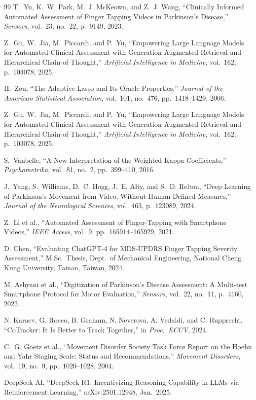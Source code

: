 \documentclass[12pt, a4paper]{article}
\begin{document}
\begin{thebibliography}{99}
T.~Yu, K.~W. Park, M.~J. McKeown, and Z.~J. Wang,
``Clinically Informed Automated Assessment of Finger Tapping Videos
in Parkinson's Disease,''
\textit{Sensors}, vol.~23, no.~22, p.~9149, 2023.

Z.~Gu, W.~Jia, M.~Piccardi, and P.~Yu,
``Empowering Large Language Models for Automated Clinical Assessment
with Generation-Augmented Retrieval and Hierarchical Chain-of-Thought,''
\textit{Artificial Intelligence in Medicine}, vol.~162, p.~103078, 2025.

H.~Zou,
``The Adaptive Lasso and Its Oracle Properties,''
\textit{Journal of the American Statistical Association},
vol.~101, no.~476, pp.~1418--1429, 2006.

Z.~Gu, W.~Jia, M.~Piccardi, and P.~Yu,
``Empowering Large Language Models for Automated Clinical Assessment
with Generation-Augmented Retrieval and Hierarchical Chain-of-Thought,''
\textit{Artificial Intelligence in Medicine}, vol.~162, p.~103078, 2025.

S.~Vanbelle,
``A New Interpretation of the Weighted Kappa Coefficients,''
\textit{Psychometrika}, vol.~81, no.~2, pp.~399--410, 2016.

J.~Yang, S.~Williams, D.~C. Hogg, J.~E. Alty, and S.~D. Relton,
``Deep Learning of Parkinson's Movement from Video, Without
Human-Defined Measures,''
\textit{Journal of the Neurological Sciences}, vol.~463, p.~123089, 2024.

Z.~Li et al.,
``Automated Assessment of Finger-Tapping with Smartphone Videos,''
\textit{IEEE Access}, vol.~9, pp.~165914--165929, 2021.

D. Chen,
``Evaluating ChatGPT-4 for MDS-UPDRS Finger Tapping Severity Assessment,''
M.Sc.\ Thesis, Dept.\ of Mechanical Engineering,
National Cheng Kung University, Tainan, Taiwan, 2024.

M. Ashyani et al.,
``Digitization of Parkinson's Disease Assessment: A Multi-test Smartphone
Protocol for Motor Evaluation,''
\textit{Sensors}, vol.~22, no.~11, p.~4160, 2022.

N. Karaev, G. Rocco, B. Graham, N. Neverova, A. Vedaldi, and C. Rupprecht,
``CoTracker: It Is Better to Track Together,''
in \textit{Proc.\ ECCV}, 2024.

C.~G. Goetz et al.,
``Movement Disorder Society Task Force Report on the Hoehn and Yahr Staging
Scale: Status and Recommendations,''
\textit{Movement Disorders}, vol.~19, no.~9, pp.~1020--1028, 2004.

DeepSeek-AI,
``DeepSeek-R1: Incentivizing Reasoning Capability in LLMs via Reinforcement
Learning,''
arXiv:2501.12948, Jan.\ 2025.

\end{thebibliography}
\end{document}
